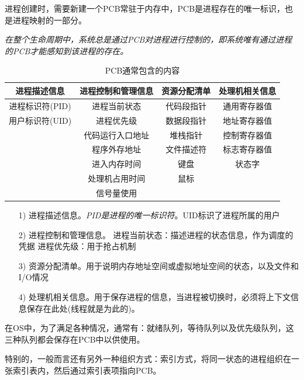     进程创建时，需要新建一个PCB常驻于内存中，PCB是进程存在的唯一标识，也是进程映射的一部分。

    \emph{在整个生命周期中，系统总是通过PCB对进程进行控制的，即系统唯有通过进程的PCB才能感知到该进程的存在。}

\begin{table}[!htbp]
    \begin{center}
        \caption{PCB通常包含的内容}
        \begin{tabular}{c | c | c | c}
            \hline
            进程描述信息 & 进程控制和管理信息 & 资源分配清单 & 处理机相关信息 \\
            \hline
            进程标识符(PID) & 进程当前状态 & 代码段指针 & 通用寄存器值 \\
            \hline
            用户标识符(UID) & 进程优先级 & 数据段指针 & 地址寄存器值 \\
            \hline
            & 代码运行入口地址 & 堆栈指针 & 控制寄存器值 \\
            \hline
            & 程序外存地址 & 文件描述符 & 标志寄存器值 \\
            \hline
            & 进入内存时间 & 键盘 & 状态字 \\
            \hline
            & 处理机占用时间 & 鼠标 & \\
            \hline
            & 信号量使用 & & \\
            \hline
        \end{tabular}
    \end{center}
\end{table}

\begin{itemize}
    \item [1)] 进程描述信息。\emph{\color{red}PID是进程的唯一标识符}。UID标识了进程所属的用户
    \item [2)] 进程控制和管理信息。
    \subitem 进程当前状态：描述进程的状态信息，作为调度的凭据
    \subitem 进程优先级：用于抢占机制
    \item [3)] 资源分配清单。用于说明内存地址空间或虚拟地址空间的状态，以及文件和I/O情况
    \item [4)] 处理机相关信息。用于保存进程的信息，当进程被切换时，必须将上下文信息保存在此处(线程就是为此的)。
\end{itemize}

    在OS中，为了满足各种情况，通常有：就绪队列，等待队列以及优先级队列，这三种队列都会保存在PCB中以供使用。

    特别的，一般而言还有另外一种组织方式：索引方式，将同一状态的进程组织在一张索引表内，然后通过索引表项指向PCB。

